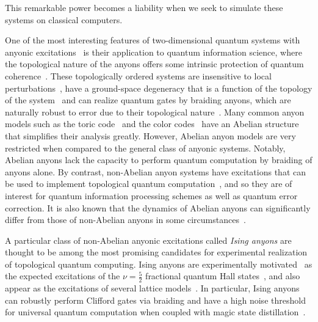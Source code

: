 \documentclass[aps, prl, letterpaper, twocolumn, superscriptaddress, notitlepage]{revtex4-1}
\begin{document}
This remarkable power becomes a liability when we seek to simulate these systems on classical computers. 

One of the most interesting features of two-dimensional quantum systems with anyonic excitations~\cite{Wilczek1990} is their application to quantum information science, where the topological nature of the anyons offers some intrinsic protection of quantum coherence~\cite{Kitaev2003}. These topologically ordered systems are insensitive to local perturbations~\cite{Bravyi2010, *Bravyi2011a, *Michalakis2013}, have a ground-space degeneracy that is a function of the topology of the system~\cite{Wen1990, Einarsson1995} and can realize quantum gates by braiding anyons, which are naturally robust to error due to their topological nature~\cite{Kitaev2003, Nayak2008}. Many common anyon models such as the toric code~\cite{Kitaev2003} and the color codes~\cite{Bombin2006} have an Abelian structure that simplifies their analysis greatly. However, Abelian anyon models are very restricted when compared to the general class of anyonic systems. Notably, Abelian anyons lack the capacity to perform quantum computation by braiding of anyons alone. By contrast, non-Abelian anyon systems have excitations that can be used to implement topological quantum computation~\cite{Freedman2002, Freedman2002b}, and so they are of interest for quantum information processing schemes as well as quantum error correction. It is also known that the dynamics of Abelian anyons can significantly differ from those of non-Abelian anyons in some circumstances~\cite{Brennen2010, Lehman2011, Lehman2012, Zatloukal2012}.

A particular class of non-Abelian anyonic excitations called \emph{Ising anyons} are thought to be among the most promising candidates for experimental realization of topological quantum computing. Ising anyons are experimentally motivated~\cite{Willett1987} as the expected excitations of the $\nu=\frac{5}{2}$ fractional quantum Hall states~\cite{Moore1991, Nayak1996}, and also appear as the excitations of several lattice models~\cite{Kitaev2006, Levin2005a, Kapit2013, Palumbo2014}. In particular, Ising anyons can robustly perform Clifford gates via braiding and have a high noise threshold for universal quantum computation when coupled with magic state distillation~\cite{Bravyi2006b, Freedman2006}. 
\end{document}
